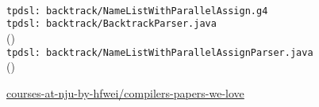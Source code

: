 \begin{frame}{}
  \begin{center}
	 \\[20pt]
	\texttt{tpdsl: backtrack/NameListWithParallelAssign.g4}  \\[40pt]
	\pause
	\texttt{tpdsl: backtrack/BacktrackParser.java}
	\\(\texttt{}) \\[30pt]
	\pause
	\texttt{tpdsl: backtrack/NameListWithParallelAssignParser.java}
	\\(\texttt{})

	\pause
	\vspace{20pt}
  \end{center}
\end{frame}

\begin{frame}{}

  \pause
  \begin{center}
	\href{https://github.com/courses-at-nju-by-hfwei/compilers-papers-we-love/tree/master/parsing}
	{courses-at-nju-by-hfwei/compilers-papers-we-love}
  \end{center}
\end{frame}
